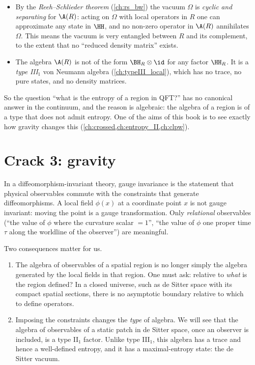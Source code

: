 \begin{itemize}
\item By the \emph{Reeh--Schlieder theorem} (\cref{ch:rs_bw}) the vacuum $\Omega$ is \emph{cyclic and separating} for $\A(R)$: acting on $\Omega$ with local operators in $R$ one can approximate any state in $\HH$, and no non-zero operator in $\A(R)$ annihilates $\Omega$. This means the vacuum is very entangled between $R$ and its complement, to the extent that no ``reduced density matrix'' exists.
\item The algebra $\A(R)$ is not of the form $\BH_R\otimes\id$ for any factor $\HH_R$. It is a \emph{type III$_1$} von Neumann algebra (\cref{ch:typeIII_local}), which has no trace, no pure states, and no density matrices.
\end{itemize}

So the question ``what is the entropy of a region in QFT?'' has no canonical answer in the continuum, and the reason is algebraic: the algebra of a region is of a type that does not admit entropy. One of the aims of this book is to see exactly how gravity changes this (\cref{ch:crossed,ch:entropy_II,ch:clpw}).

\section{Crack 3: gravity}

In a diffeomorphism-invariant theory, gauge invariance is the statement that physical observables commute with the constraints that generate diffeomorphisms. A local field $\phi(x)$ at a coordinate point $x$ is not gauge invariant: moving the point is a gauge transformation. Only \emph{relational} observables (``the value of $\phi$ where the curvature scalar $=1$'', ``the value of $\phi$ one proper time $\tau$ along the worldline of the observer'') are meaningful.

Two consequences matter for us.

\begin{enumerate}
\item The algebra of observables of a spatial region is no longer simply the algebra generated by the local fields in that region. One must ask: relative to \emph{what} is the region defined? In a closed universe, such as de Sitter space with its compact spatial sections, there is no asymptotic boundary relative to which to define operators.
\item Imposing the constraints changes the \emph{type} of algebra. We will see that the algebra of observables of a static patch in de Sitter space, once an observer is included, is a type II$_1$ factor. Unlike type III$_1$, this algebra has a trace and hence a well-defined entropy, and it has a maximal-entropy state: the de Sitter vacuum.
\end{enumerate}

